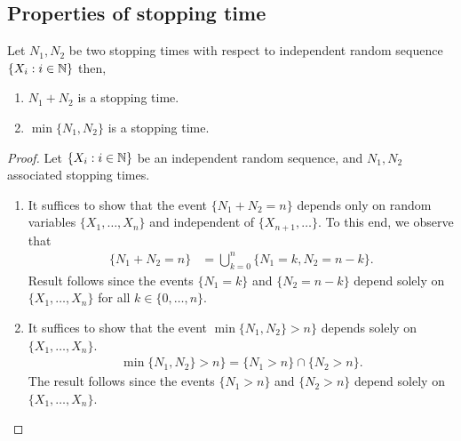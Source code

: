 \documentclass[a4paper,10pt,english]{article}
\begin{document}
\subsection{Properties of stopping time}
Let $N_1,N_2$ be two stopping times with respect to independent random sequence $\{X_i : i \in \mathbb{N} \}$ then,
\begin{enumerate}[i\_]
\item $N_1+N_2$ is a stopping time.
\item $\min \{N_1,N_2\} $ is a stopping time.
\end{enumerate}
\begin{proof}
Let $\{X_i : i \in \mathbb{N} \} $ be an independent random sequence, and $N_1,N_2$ associated stopping times.  
\begin{enumerate}[i\_]
\item It suffices to show that the event $\{N_1+N_2=n\}$ depends only on random variables $\{X_1, \dots, X_n\}$ and independent of $\{X_{n+1}, \dots\}$. 
To this end, we observe that 
\begin{align*}
\{N_1+N_2 = n \} &= \bigcup_{k=0}^{n} \{N_1 = k,N_2 = n-k\}.
\end{align*}
Result follows since the events $\{N_1 = k\}$ and $\{N_2=n-k\}$ depend solely on $\{X_1, \dots, X_n\}$ for all $k \in \{0, \dots, n\}$. 
\item It suffices to show that the event $\min \{N_1,N_2\} > n\}$ depends solely on $\{X_1, \dots, X_n\}$. 
\begin{align*}
\min \{N_1,N_2\} > n\} = \{N_1 > n\} \cap \{N_2 > n\}.
\end{align*}
The result follows since the events $\{N_1 > n\}$ and $\{N_2 > n\}$ depend solely on $\{X_1, \dots, X_n\}$. 
\end{enumerate}
\end{proof}
\end{document}
